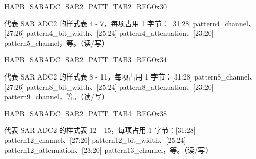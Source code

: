 \begin{register}{H}{APB\_SARADC\_SAR2\_PATT\_TAB2\_REG}{0x30}\label{regdesc:APBSARADCSAR2PATTTAB2REG}
%
\regnewline%
\begin{regdesc}\begin{reglist}
\item [APB\_SARADC\_SAR2\_PATT\_TAB2\_REG] 代表 SAR ADC2 的样式表 4 - 7，每项占用 1 字节： [31:28] pattern4\_channel、[27:26] pattern4\_bit\_width、[25:24] pattern4\_attenuation、[23:20] pattern5\_channel，等。（读/写）
\end{reglist}\end{regdesc}
\end{register}


\begin{register}{H}{APB\_SARADC\_SAR2\_PATT\_TAB3\_REG}{0x34}\label{regdesc:APBSARADCSAR2PATTTAB3REG}
%
\regnewline%
\begin{regdesc}\begin{reglist}
\item [APB\_SARADC\_SAR2\_PATT\_TAB3\_REG] 代表 SAR ADC2 的样式表 8 - 11，每项占用 1 字节：[31:28] pattern8\_channel、[27:26] pattern8\_bit\_width、[25:24] pattern8\_attenuation、[23:20] pattern9\_channel，等。（读/写）
\end{reglist}\end{regdesc}
\end{register}


\begin{register}{H}{APB\_SARADC\_SAR2\_PATT\_TAB4\_REG}{0x38}\label{regdesc:APBSARADCSAR2PATTTAB4REG}
%
\regnewline%
\begin{regdesc}\begin{reglist}
\item [APB\_SARADC\_SAR2\_PATT\_TAB4\_REG] 代表 SAR ADC2 的样式表 12 - 15，每项占用 1 字节：[31:28] pattern12\_channel、[27:26] pattern12\_bit\_width、[25:24] pattern12\_attenuation、[23:20] pattern13\_channel，等。（读/写）
\end{reglist}\end{regdesc}
\end{register}
